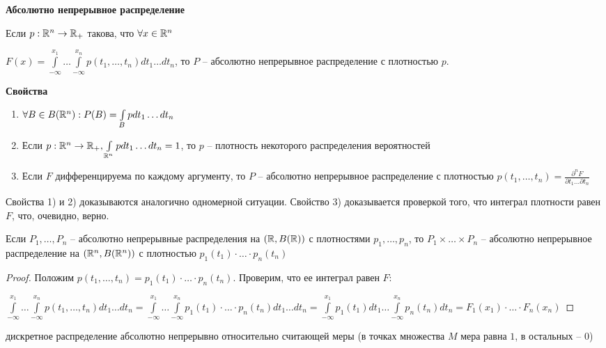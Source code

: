 \textbf{Абсолютно непрерывное распределение}

\begin{definition}
Если $p: \mathbb{R}^n \to \mathbb{R}_+$ такова, что $\forall x \in \mathbb{R}^n$
\end{definition}

$F(x) = \int\limits_{-\infty}^{x_1}\ldots\int\limits_{-\infty}^{x_n} p(t_1, \ldots, t_n)dt_1\ldots dt_n$, то $P$ -- абсолютно непрерывное распределение с плотностью $p$.

\textbf{Свойства}

\begin{enumerate}
    \item $\forall B \in B(\mathbb{R}^n) : P(B) = \int\limits_B p dt_1\ldots dt_n$
    \item Если $p : \mathbb{R}^n \to \mathbb{R}_+, \int\limits_{\mathbb{R}^n}p dt_1 \ldots dt_n = 1$, то $p$ -- плотность некоторого распределения вероятностей
    \item Если $F$ дифференцируема по каждому аргументу, то $P$ -- абсолютно непрерывное распределение с плотностью $p(t_1, \ldots, t_n) = \frac{\partial^n F}{\partial t_1 \ldots \partial t_n}$
\end{enumerate}

Свойства 1) и 2) доказываются аналогично одномерной ситуации. Свойство 3) доказывается проверкой того, что интеграл плотности равен $F$, что, очевидно, верно.

\begin{statement}
Если $P_1, \ldots, P_n$ -- абсолютно непрерывные распределения на $(\mathbb{R}, B(\mathbb{R}))$ с плотностями $p_1, \ldots, p_n$, то $P_1 \times \ldots \times P_n$ -- абсолютно непрерывное распределение на $(\mathbb{R}^n, B(\mathbb{R}^n))$ с плотностью $p_1(t_1) \cdot \ldots \cdot p_n(t_n)$
\end{statement}

\begin{proof}
Положим $p(t_1, \ldots, t_n) = p_1(t_1) \cdot \ldots \cdot p_n(t_n)$. Проверим, что ее интеграл равен $F$:

$\int\limits_{-\infty}^{x_1}\ldots\int\limits_{-\infty}^{x_n} p(t_1, \ldots, t_n)dt_1\ldots dt_n = \int\limits_{-\infty}^{x_1}\ldots\int\limits_{-\infty}^{x_n}  p_1(t_1) \cdot \ldots \cdot p_n(t_n)dt_1\ldots dt_n = \int\limits_{-\infty}^{x_1}p_1(t_1)dt_1\ldots\int\limits_{-\infty}^{x_n}p_n(t_n)dt_n = F_1(x_1)\cdot \ldots \cdot F_n(x_n)$
\end{proof}

\begin{lemmanote}
дискретное распределение абсолютно непрерывно относительно считающей меры (в точках множества $M$ мера равна $1$, в остальных -- $0$)
\end{lemmanote}